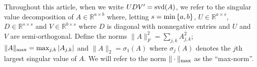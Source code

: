 \documentclass[12pt]{article}
\newcommand{\argmin}{\operatorname*{arg \ min}}
\begin{document}
Throughout this article, when we write $UDV' = {\rm svd}(A)$, we refer to the singular value decomposition of $A \in \mathbb{R}^{a \times b}$ where, letting $s = {\rm min}\left\{a, b\right\}$, $U \in \mathbb{R}^{a \times s}$, $D \in \mathbb{R}^{s \times s}$ and $V \in \mathbb{R}^{b \times s}$ where $D$ is diagonal with nonnegative entries and $U$ and $V$ are semi-orthogonal. Define the norms $\|A\|_F^2 = \sum_{j,k} A_{j,k}^2$; $\|A\|_{\rm max} = \max_{j,k}|A_{j,k}|$ and $\|A\|_2 = \sigma_1(A)$ where $\sigma_j(A)$ denotes the $j$th largest singular value of $A$. We will refer to the norm $\| \cdot\|_{\rm max}$ as the ``max-norm''. 

\end{document}

